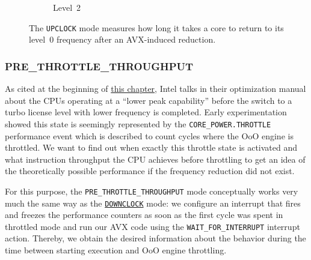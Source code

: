 \begin{figure*}
\begin{subfigure}[b]{0.4\textwidth}
		\caption{Level~2}
	\end{subfigure}
	\caption{The \texttt{UPCLOCK} mode measures how long it takes a core to return to its level~0 frequency after an \gls{AVX}-induced reduction.}
	\label{fig:analysis:design:measurementmodes:upclock}
\end{figure*}

\subsubsection{PRE\_THROTTLE\_THROUGHPUT}
\label{sec:analysis:design:measurementmodes:prethrottlethroughput}

As cited at the beginning of \hyperref[sec:analysis]{this chapter}, Intel talks in their optimization manual \cite{inteloptimizationmanual} about the \glspl{CPU} operating at a \enquote{lower peak capability} before the switch to a turbo license level with lower frequency is completed. Early experimentation showed this state is seemingly represented by the \texttt{CORE\_POWER.THROTTLE} performance event which is described \cite{intelsdmsysprogguide} to count cycles where the \gls{OoO} engine is throttled. We want to find out when exactly this throttle state is activated and what instruction throughput the \gls{CPU} achieves before throttling to get an idea of the theoretically possible performance if the frequency reduction did not exist.

For this purpose, the \texttt{PRE\_THROTTLE\_THROUGHPUT} mode conceptually works very much the same way as the \hyperref[sec:analysis:design:measurementmodes:downclock]{\texttt{DOWNCLOCK}} mode: we configure an interrupt that fires and freezes the performance counters as soon as the first cycle was spent in throttled mode and run our \gls{AVX} code using the \texttt{WAIT\_FOR\_INTERRUPT} interrupt action. Thereby, we obtain the desired information about the behavior during the time between starting execution and \gls{OoO} engine throttling.

